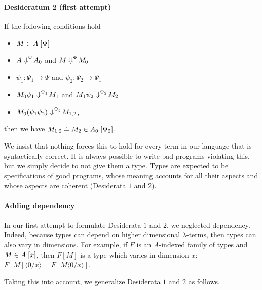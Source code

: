 \documentclass{article}
\newcommand\DimSubst[3]{#3\langle{#1}/{#2}\rangle}
\begin{document}
\paragraph{Desideratum 2 (first attempt)}
If the following conditions hold
\begin{itemize}
\item $\InTypeDim{M}{A}{\Psi}$
\item $\evalDim{A}{A_0}{\Psi}$ and $\evalDim{M}{M_0}{\Psi}$
\item $\psi_1 : \Psi_1 \to \Psi$ and $\psi_2 : \Psi_2 \to \Psi_1$
\item $\evalDim{M_0 \psi_1}{M_1}{\Psi_1}$ and $\evalDim{M_1 \psi_2}{M_2}{\Psi_2}$
\item $\evalDim{M_0(\psi_1\psi_2)}{M_{1,2}}{\Psi_2}$,
\end{itemize}
then we have $\EqInTypeDim{M_{1,2}}{M_2}{A_0}{\Psi_2}$.

\bigskip

We insist that nothing forces this to hold for every term in our
language that is syntactically correct. It is always possible to write
bad programs violating this, but we simply decide to not give them a
type. Types are expected to be specifications of good programs, whose
meaning accounts for all their aspects and whose aspects are coherent
(Desiderata $1$ and $2$).

\paragraph{Adding dependency}

In our first attempt to formulate Desiderata $1$ and $2$, we neglected
dependency. Indeed, because types can depend on higher dimensional
$\lambda$-terms, then types can also vary in dimensions. For example,
if $F$ is an $A$-indexed family of types and $\InTypeDim{M}{A}{x}$,
then $F[M]$ is a type which varies in dimension $x$: 
$\DimSubst{0}{x}{F[M]} = F[\DimSubst{0}{x}{M}]$.

Taking this into account, we generalize Desiderata $1$ and $2$ as follows.
\end{document}
